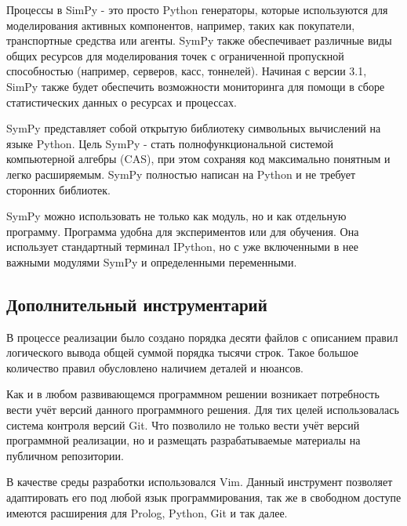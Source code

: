 	Процессы в SimPy - это просто Python генераторы, которые используются для моделирования активных компонентов, например, таких как покупатели, транспортные средства или агенты. SymPy также обеспечивает различные виды общих ресурсов для моделирования точек с ограниченной пропускной способностью (например, серверов, касс, тоннелей). Начиная с версии 3.1, SimPy также будет обеспечить возможности мониторинга для помощи в сборе статистических данных о ресурсах и процессах. 

	SymPy представляет собой открытую библиотеку символьных вычислений на языке Python. Цель SymPy - стать полнофункциональной системой компьютерной алгебры (CAS), при этом сохраняя код максимально понятным и легко расширяемым. SymPy полностью написан на Python и не требует сторонних библиотек.

	SymPy можно использовать не только как модуль, но и как отдельную программу. Программа удобна для экспериментов или для обучения. Она использует стандартный терминал IPython, но с уже включенными в нее важными модулями SymPy и определенными переменными.

	\subsection{Дополнительный инструментарий}

		В процессе реализации было создано порядка десяти файлов с описанием правил логического вывода
			общей суммой порядка тысячи строк. Такое большое количество правил обусловлено наличием деталей и нюансов.

		Как и в любом развивающемся программном решении возникает потребность вести учёт версий данного
			программного решения. Для тих целей использовалась система контроля версий Git.
			Что позволило не только вести учёт версий программной реализации,
			но и размещать разрабатываемые материалы на публичном репозитории.

		В качестве среды разработки использовался Vim. Данный инструмент позволяет адаптировать его
			под любой язык программирования, так же в свободном доступе имеются расширения для Prolog,
			Python, Git и так далее.

